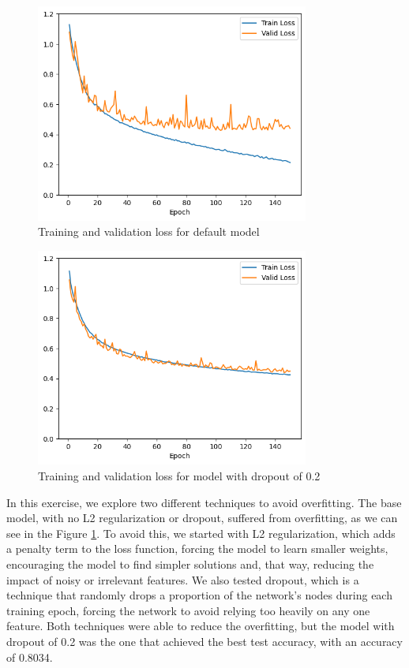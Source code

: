 \documentclass{article}
\begin{document}
\begin{figure}[H]
    \centering
    \includegraphics[width=0.8\textwidth]{"plots/mlp-training-loss-batch-256-lr-0.1-epochs-150-hidden-200-dropout-0.0-l2-0-layers-2-act-relu-opt-sgd.png"}
    \caption{Training and validation loss for default model}
    \label{2.2c default model}
\end{figure}

\begin{figure}[H]
    \centering
    \includegraphics[width=0.8\textwidth]{"plots/mlp-training-loss-batch-256-lr-0.1-epochs-150-hidden-200-dropout-0.2-l2-0-layers-2-act-relu-opt-sgd.png"}
    \caption{Training and validation loss for model with dropout of 0.2}
    \label{2.2c dropout 0.2}
\end{figure}

In this exercise, we explore two different techniques to avoid overfitting. The base model, with no L2 regularization or dropout, 
suffered from overfitting, as we can see in the Figure \ref{2.2c default model}. To avoid this, we started with L2 regularization,
which adds a penalty term to the loss function, forcing the model to learn smaller weights, encouraging the model to find simpler solutions and,
that way, reducing the impact of noisy or irrelevant features. We also tested dropout, which is a technique that randomly drops a proportion of 
the network's nodes during each training epoch, forcing the network to avoid relying too heavily on any one feature. Both techniques were able to
reduce the overfitting, but the model with dropout of 0.2 was the one that achieved the best test accuracy, with an accuracy of 0.8034.
\end{document}
